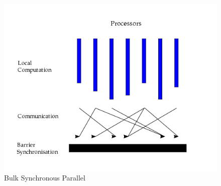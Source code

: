 \documentclass[english]{tktltiki}
\begin{document}
\begin{figure}[ht!]
\centering
\includegraphics[width=130mm]{figures/bsp.png}
\caption{Bulk Synchronous Parallel}
\end{figure}
\end{document}
